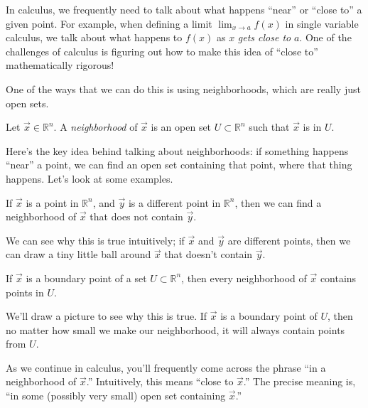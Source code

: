 \documentclass{ximera}
\begin{document}
In calculus, we frequently need to talk about what happens ``near'' or ``close to'' a given point. For example, when defining a limit $\lim_{x\rightarrow a} f(x)$ in single variable calculus, we talk about what happens to $f(x)$ as $x$ \emph{gets close to} $a$. One of the challenges of calculus is figuring out how to make this idea of ``close to'' mathematically rigorous!

One of the ways that we can do this is using neighborhoods, which are really just open sets.

\begin{definition}
Let $\vec{x}\in\mathbb{R}^n$. A \emph{neighborhood} of $\vec{x}$ is an open set $U\subset\mathbb{R}^n$ such that $\vec{x}$ is in $U$.
\end{definition}

Here's the key idea behind talking about neighborhoods: if something happens ``near'' a point, we can find an open set containing that point, where that thing happens. Let's look at some examples.

\begin{example}
If $\vec{x}$ is a point in $\mathbb{R}^n$, and $\vec{y}$ is a different point in $\mathbb{R}^n$, then we can find a neighborhood of $\vec{x}$ that does not contain $\vec{y}$.

We can see why this is true intuitively; if $\vec{x}$ and $\vec{y}$ are different points, then we can draw a tiny little ball around $\vec{x}$ that doesn't contain $\vec{y}$.

\begin{image}
\end{image}
\end{example}

\begin{example}
If $\vec{x}$ is a boundary point of a set $U\subset\mathbb{R}^n$, then every neighborhood of $\vec{x}$ contains points in $U$.

We'll draw a picture to see why this is true. If $\vec{x}$ is a boundary point of $U$, then no matter how small we make our neighborhood, it will always contain points from $U$.

\begin{image}
\end{image}
\end{example}

As we continue in calculus, you'll frequently come across the phrase ``in a neighborhood of $\vec{x}$.'' Intuitively, this means ``close to $\vec{x}$.'' The precise meaning is, ``in some (possibly very small) open set containing $\vec{x}$.''
\end{document}
